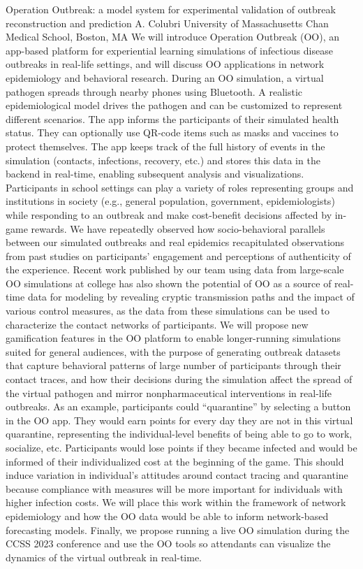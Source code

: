 
    \begin{abstract_online}{Operation Outbreak: a model system for experimental validation of outbreak reconstruction and prediction}{%
        A. Colubri}{%
        }{%
        University of Massachusetts Chan Medical School, Boston, MA}
    We will introduce Operation Outbreak (OO), an app-based platform for experiential learning simulations of infectious disease outbreaks in real-life settings, and will discuss OO applications in network epidemiology and behavioral research. During an OO simulation, a virtual pathogen spreads through nearby phones using Bluetooth. A realistic epidemiological model drives the pathogen and can be customized to represent different scenarios. The app informs the participants of their simulated health status. They can optionally use QR-code items such as masks and vaccines to protect themselves. The app keeps track of the full history of events in the simulation (contacts, infections, recovery, etc.) and stores this data in the backend in real-time, enabling subsequent analysis and visualizations. Participants in school settings can play a variety of roles representing groups and institutions in society (e.g., general population, government, epidemiologists) while responding to an outbreak and make cost-benefit decisions affected by in-game rewards. We have repeatedly observed how socio-behavioral parallels between our simulated outbreaks and real epidemics recapitulated observations from past studies on participants’ engagement and perceptions of authenticity of the experience. Recent work published by our team using data from large-scale OO simulations at college has also shown the potential of OO as a source of real-time data for modeling by revealing cryptic transmission paths and the impact of various control measures, as the data from these simulations can be used to characterize the contact networks of participants. We will propose new gamification features in the OO platform to enable longer-running simulations suited for general audiences, with the purpose of generating outbreak datasets that capture behavioral patterns of large number of participants through their contact traces, and how their decisions during the simulation affect the spread of the virtual pathogen and mirror nonpharmaceutical interventions in real-life outbreaks. As an example, participants could “quarantine” by selecting a button in the OO app. They would earn points for every day they are not in this virtual quarantine, representing the individual-level benefits of being able to go to work, socialize, etc. Participants would lose points if they became infected and would be informed of their individualized cost at the beginning of the game. This should induce variation in individual’s attitudes around contact tracing and quarantine because compliance with measures will be more important for individuals with higher infection costs. We will place this work within the framework of network epidemiology and how the OO data would be able to inform network-based forecasting models. Finally, we propose running a live OO simulation during the CCSS 2023 conference and use the OO tools so attendants can visualize the dynamics of the virtual outbreak in real-time. 
    
    \end{abstract_online}
    